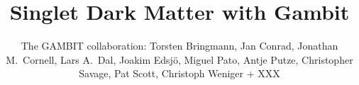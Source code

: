 %
%
%
%
%
%
\RequirePackage{fix-cm}
%
\documentclass[twocolumn,epjc3]{svjour3}  
%
\smartqed  %
%
\RequirePackage{graphicx}
%
%
\RequirePackage{latexsym}
%
%
%


\title{Singlet Dark Matter with Gambit}



\author{The GAMBIT collaboration: Torsten Bringmann, Jan Conrad, Jonathan M.~Cornell, Lars A.~Dal, Joakim Edsj\"o, Miguel Pato, Antje Putze, Christopher Savage, Pat Scott, Christoph Weniger + XXX
}



